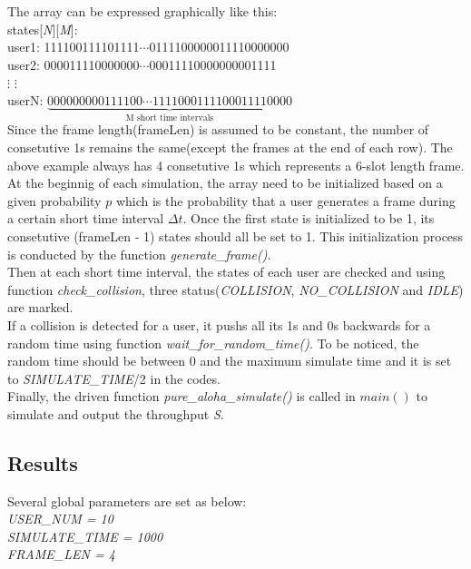 \documentclass[11pt,a4paper]{report}
\begin{document}
The array can be expressed graphically like this: \\

states[\emph{N}][\emph{M}]: \\

\qquad user1: 111100111101111\(\cdots\)0111100000011110000000 \\

\qquad user2: 000011110000000\(\cdots\)00011110000000001111 \\

\qquad\quad \(\vdots\) \hspace{35mm} \(\vdots\) \\

\qquad userN: \hspace{-0.5mm}\(\underbrace{000000000111100\cdots1111000111100011110000}_\text{M short time intervals}\) \\

Since the frame length(frameLen) is assumed to be constant, the number of consetutive 1s remains the same(except the frames at the end of each row). The above example always has 4 consetutive 1s which represents a 6-slot length frame. \\

At the beginnig of each simulation, the array need to be initialized based on a given probability \(p\) which is the probability that a user generates a frame during a certain short time interval \(\Delta t\). Once the first state is initialized to be 1, its consetutive (frameLen - 1) states should all be set to 1. This initialization process is conducted by the function \emph{generate\_frame()}.\\

Then at each short time interval, the states of each user are checked and using function \emph{check\_collision}, three status(\emph{COLLISION}, \emph{NO\_COLLISION} and \emph{IDLE}) are marked. \\

If a collision is detected for a user, it pushs all its 1s and 0s backwards for a random time using function \emph{wait\_for\_random\_time()}. To be noticed, the random time should be between 0 and the maximum simulate time and it is set to \emph{SIMULATE\_TIME}/2 in the codes. \\

Finally, the driven function \emph{pure\_aloha\_simulate()} is called in \(main()\) to simulate and output the throughput \emph{S}.


\subsection*{Results}
Several global parameters are set as below: \\
\emph{USER\_NUM = 10} \\
\emph{SIMULATE\_TIME = 1000} \\
\emph{FRAME\_LEN = 4} \\
\end{document}
